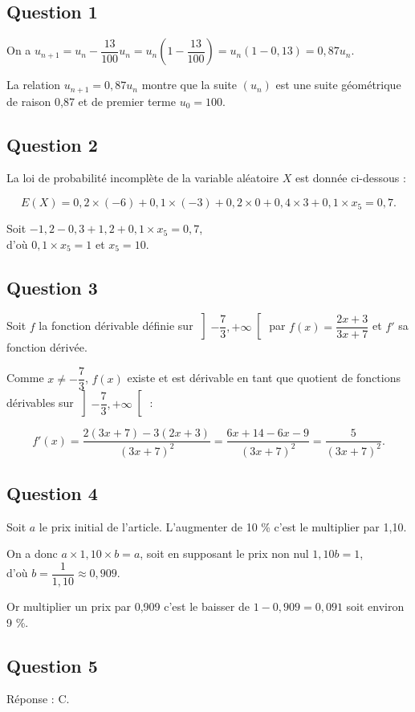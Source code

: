 \subsection*{Question 1}
	
	On a \(u_{n+1} = u_n - \dfrac{13}{100} u_n = u_n \left(1 - \dfrac{13}{100}\right) = u_n (1 - 0,13) = 0,87 u_n\).
	
	La relation \(u_{n+1} = 0,87 u_n\) montre que la suite \((u_n)\) est une suite géométrique de raison 0,87 et de premier terme \(u_0 = 100\).
	
	\subsection*{Question 2}
	
	La loi de probabilité incomplète de la variable aléatoire \(X\) est donnée ci-dessous :
	
	\[
	E(X) = 0,2 \times (-6) + 0,1 \times (-3) + 0,2 \times 0 + 0,4 \times 3 + 0,1 \times x_5 = 0,7.
	\]
	
	Soit \(-1,2 - 0,3 + 1,2 + 0,1 \times x_5 = 0,7\),\\ d’où \(0,1 \times x_5 = 1\) et \(x_5 = 10\).
	
	\subsection*{Question 3}
	
	Soit \(f\) la fonction dérivable définie sur \(\left] -\dfrac{7}{3}, +\infty \right[\) par \(f(x) = \dfrac{2x + 3}{3x + 7}\) et \(f'\) sa fonction dérivée.
	
	Comme \(x \neq -\dfrac{7}{3}\), \(f(x)\) existe et est dérivable en tant que quotient de fonctions dérivables sur \(\left] -\dfrac{7}{3}, +\infty \right[\) :
	
	\[
	f'(x) = \dfrac{2(3x + 7) - 3(2x + 3)}{(3x + 7)^2} = \dfrac{6x + 14 - 6x - 9}{(3x + 7)^2} = \dfrac{5}{(3x + 7)^2}.
	\]
	
	\subsection*{Question 4}
	
	Soit \(a\) le prix initial de l’article. L’augmenter de 10 \% c’est le multiplier par 1,10.
	
	On a donc \(a \times 1,10 \times b = a\), soit en supposant le prix non nul \(1,10b = 1\),\\ d’où \(b = \dfrac{1}{1,10} \approx 0,909\).
	
	Or multiplier un prix par 0,909 c’est le baisser de \(1 - 0,909 = 0,091\) soit environ 9 \%.
	
	\subsection*{Question 5}
	
	Réponse : C.
